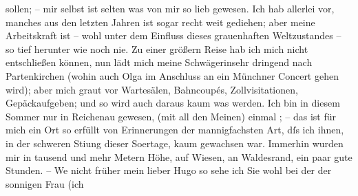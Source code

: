 \begin{ledgroupsized}[t]{13cm}
               sollen; – mir selbst ist selten was von mir so lieb gewesen. Ich hab allerlei vor,
               manches aus den letzten Jahren ist sogar recht weit gediehen; aber meine Arbeitskraft
               ist – wohl unter dem Einfluss dieses grauenhaften Weltzustandes – so tief herunter
               wie noch nie. Zu einer größern Reise hab ich mich nicht entschließen können, nun lädt
               mich meine Schwägerinsehr dringend nach Partenkirchen (wohin auch Olga im
               Anschluss an ein Münchner Concert\strikeout{)} gehen wird); aber mich graut vor Wartesälen,
               Bahncoupés, Zollvisitationen, Gepäckaufgeben; und so wird auch daraus kaum was
               werden. Ich bin in diesem Sommer {\pb}nur in Reichenau gewesen, \label{K_L02327_3v}\label{K_L02327_3h} (mit
               all den Meinen) einmal \label{K_L02327_4v}\label{K_L02327_4h}; – das ist für mich ein Ort
               so erfüllt von Erinnerungen der mannigfachsten Art, dſs ich ihnen, in der schweren
                  Sti{\geminationm}ung dieser So{\geminationm}ertage, kaum gewachsen war. Immerhin wurden mir in tausend und mehr Metern Höhe,
               auf Wiesen, an Waldesrand, ein paar gute Stunden.\pend
           \pstart
           – We{\geminationn} nicht früher mein lieber Hugo so sehe ich Sie wohl
               bei der \label{K_L02327_5v}\label{K_L02327_5h} der sonnigen Frau (ich

\end{ledgroupsized}
